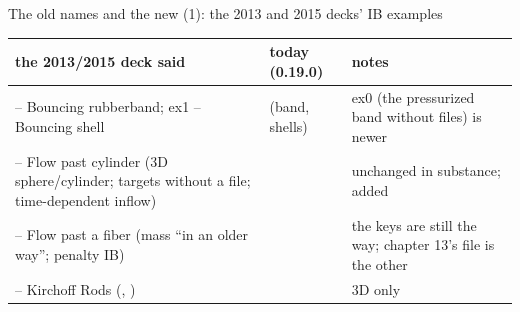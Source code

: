 \documentclass[aspectratio=169,11pt]{beamer}
\begin{document}
\begin{frame}{The old names and the new (1): the 2013 and 2015 decks' IB examples}
\label{fr:oldnames}
\scriptsize
\setlength{\tabcolsep}{3pt}
\begin{tabular}{@{}L{0.3\textwidth}L{0.26\textwidth}L{0.38\textwidth}@{}}
\toprule
the 2013/2015 deck said & today (0.19.0) & notes\\
\midrule
{} -- Bouncing rubberband; ex1 -- Bouncing shell &  (band, shells) & ex0 (the pressurized band without files) is newer\\
 -- Flow past cylinder (3D sphere/cylinder; targets without a  file; time-dependent inflow) &  & unchanged in substance;  added\\
 -- Flow past a fiber (mass ``in an older way''; penalty IB) &  & the  keys are still the way; chapter 13's  file is the other\\
 -- Kirchoff Rods (, ) &  & 3D only\\
\bottomrule
\end{tabular}
\end{frame}
\end{document}
